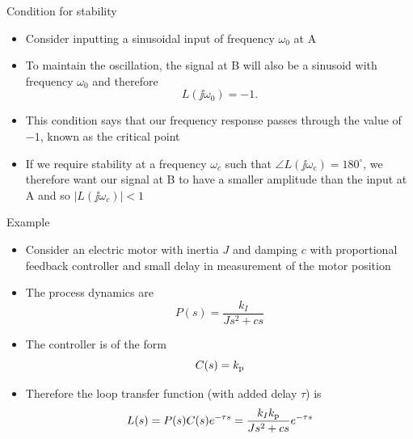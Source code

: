 \documentclass[10pt]{beamer-control}
\begin{document}
\begin{frame}{Condition for stability}
	
\begin{itemize}
	\item Consider inputting a sinusoidal input of frequency $\omega_0$ at A
	\item To maintain the oscillation, the signal at B will also be a sinusoid with frequency $\omega_0$ and therefore
	\begin{equation}L(\jj\omega_0)=-1.\end{equation}
	\item This condition says that our frequency response passes through the value of $-1$, known as the \alert{critical point}
	\item If we require stability at a frequency $\omega_c$ such that $\angle L\left(\jj \omega_{\mathrm{c}}\right)=180^{\circ}$, we therefore want our signal at B to have a smaller amplitude than the input at A and so $|L(\jj\omega_c)|<1$
\end{itemize}
\end{frame}



\begin{frame}{Example}
\begin{itemize}
\item Consider an electric motor with inertia $J$ and damping $c$ with proportional feedback controller and small delay in measurement of the motor position
\item The process dynamics are 
\begin{equation}P(s) = \frac{k_I}{Js^2+cs}\end{equation}
\item The controller is of the form
\begin{equation}C(s) = k_{\mathrm{p}}\end{equation}
\item Therefore the loop transfer function (with added delay $\tau$) is
\begin{equation}L(s) = P(s) C(s) e^{-\tau s} = \frac{k_Ik_{\mathrm{p}}}{Js^2+cs}e^{-\tau s}\end{equation}
\end{itemize}
\end{frame}
\end{document}
